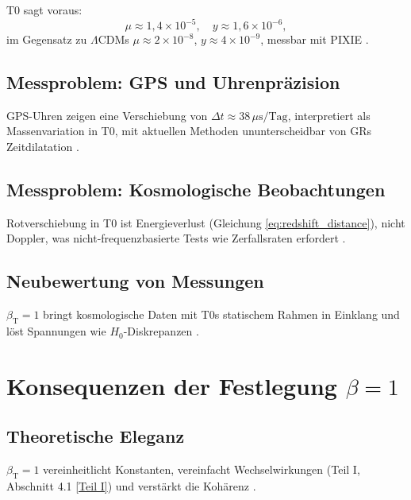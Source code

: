 \documentclass[twocolumn,aps,prl]{revtex4-2}
\newcommand{\betaT}{\beta_{\text{T}}}
\newcommand{\LCDM}{\Lambda\text{CDM}}
\begin{document}
	T0 sagt voraus:
	\begin{equation}
		\mu \approx 1,4 \times 10^{-5}, \quad y \approx 1,6 \times 10^{-6},
		\label{eq:distortion_parameters}
	\end{equation}
	im Gegensatz zu \(\LCDM\)s \(\mu \approx 2 \times 10^{-8}\), \(y \approx 4 \times 10^{-9}\), messbar mit PIXIE \cite{pascher_temp_2025}.
	
	\subsection{Messproblem: GPS und Uhrenpräzision}
	\label{subsec:gps_clock_problem}
	
	GPS-Uhren zeigen eine Verschiebung von \(\Delta t \approx 38 \, \mu\text{s/Tag}\), interpretiert als Massenvariation in T0, mit aktuellen Methoden ununterscheidbar von GRs Zeitdilatation \cite{pascher_quantum_2025}.
	
	\subsection{Messproblem: Kosmologische Beobachtungen}
	\label{subsec:cosmological_measurement_problem}
	
	Rotverschiebung in T0 ist Energieverlust (Gleichung \ref{eq:redshift_distance}), nicht Doppler, was nicht-frequenzbasierte Tests wie Zerfallsraten erfordert \cite{pascher_alphabeta_2025}.
	
	\subsection{Neubewertung von Messungen}
	\label{subsec:reassessment_measurements}
	
	\(\betaT = 1\) bringt kosmologische Daten mit T0s statischem Rahmen in Einklang und löst Spannungen wie \(H_0\)-Diskrepanzen \cite{DiValentino2021}.
	
	\section{Konsequenzen der Festlegung \(\beta = 1\)}
	\label{sec:consequences_beta}
	
	\subsection{Theoretische Eleganz}
	\label{subsec:theoretical_elegance}
	
	\(\betaT = 1\) vereinheitlicht Konstanten, vereinfacht Wechselwirkungen (Teil I, Abschnitt 4.1 \href{https://github.com/jpascher/T0-Time-Mass-Duality/tree/main/2/pdf/Deutsch/QMRelTimeMassPart1.pdf}{[Teil I]}) und verstärkt die Kohärenz \cite{pascher_alphabeta_2025}.
	
\end{document}
